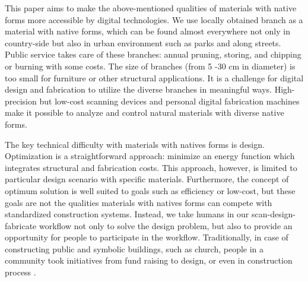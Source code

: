 This paper aims to make the above-mentioned qualities of materials with native forms more accessible by digital technologies.
We use locally obtained branch as a material with native forms, which can be found almost everywhere not only in country-side but also in urban environment such as parks and along streets.
Public service takes care of these branches: annual pruning, storing, and chipping or burning with some costs.
The size of branches (from 5 -30 cm in diameter) is too small for furniture or other structural applications.
It is a challenge for digital design and fabrication to utilize the diverse branches in meaningful ways.
High-precision but low-cost scanning devices and personal digital fabrication machines make it possible to analyze and control natural materials with diverse native forms.

The key technical difficulty with materials with natives forms is design.
Optimization is a straightforward approach: minimize an energy function which integrates structural and fabrication costs.
This approach, however, is limited to particular design scenario with specific materials.
Furthermore, the concept of optimum solution is well suited to goals such as efficiency or low-cost, but these goals are not the qualities materials with natives forms can compete with standardized construction systems.
Instead, we take humans in our scan-design-fabricate workflow not only to solve the design problem, but also to provide an opportunity for people to participate in the workflow.
Traditionally, in case of constructing public and symbolic buildings, such as church, people in a community took initiatives from fund raising to design, or even in construction process \cite{}. 




